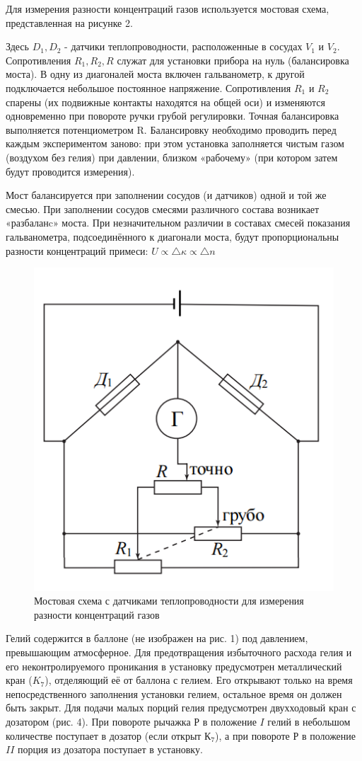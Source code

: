 \documentclass[a4paper, 12pt]{article} %
\begin{document}
Для измерения разности концентраций газов используется мостовая схема, представленная на рисунке 2.

Здесь $D_1, D_2$ - датчики теплопроводности, расположенные в сосудах $V_1$ и $V_2$. Сопротивления $R_1, R_2, R$ служат для установки прибора на нуль (балансировка моста). В одну из диагоналей моста включен гальванометр, к другой подключается небольшое постоянное напряжение. Сопротивления $R_1$ и $R_2$ спарены (их подвижные контакты находятся на общей оси) и изменяются одновременно при повороте ручки грубой регулировки. Точная балансировка выполняется потенциометром R. Балансировку необходимо проводить перед каждым экспериментом заново: при этом установка заполняется чистым газом (воздухом без гелия) при давлении, близком «рабочему» (при котором затем будут проводится измерения).

Мост балансируется при заполнении сосудов (и датчиков) одной и той же смесью. При заполнении сосудов смесями различного состава возникает «разбаланc» моста. При незначительном различии в составах смесей показания гальванометра, подсоединённого к диагонали моста, будут пропорциональны разности концентраций примеси: $U \propto \triangle \kappa \propto \triangle n$
 
\begin{figure}[h]
    \centering
    \includegraphics[width = 5.5 cm]{scheme.png}
    \caption{Мостовая схема с датчиками теплопроводности для измерения разности концентраций газов}
    \label{fig:vac}
\end{figure} 

Гелий содержится в баллоне (не изображен на рис. 1) под давлением, превышающим атмосферное. Для предотвращения избыточного расхода гелия и
его неконтролируемого проникания в установку предусмотрен металлический кран ($K_7$), отделяющий её от баллона с гелием. Его открывают только на
время непосредственного заполнения установки гелием, остальное время он должен быть закрыт. Для подачи малых порций гелия предусмотрен двухходовый кран с дозатором (рис. 4). При повороте рычажка $Р$ в положение $I$ гелий в небольшом количестве поступает в дозатор (если открыт $К_7$), а при повороте $Р$ в положение $II$ порция из дозатора поступает в установку.
\end{document}
